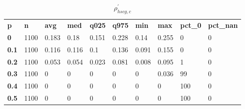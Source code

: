\begin{table}[h]
 \centering 
\footnotesize
\caption{$\rho_{hscg,c}^\prime $}
\label{tab:alphahscgc}
\begin{tabular}[h]{| l l l l l l l l l l|
    } \hline
\textbf{ p} & \textbf{ n} & \textbf{ avg} & \textbf{ med} & \textbf{ q025} & \textbf{ q975} & \textbf{ min} & \textbf{ max} & \textbf{ pct\_0} & \textbf{ pct\_nan}
           \\
  \textbf{  0} & 1100 & 0.183 &  0.18 & 0.151 & 0.228 &  0.14 & 0.255 &   0 & 0
           \\
  \textbf{0.1} & 1100 & 0.116 & 0.116 &   0.1 & 0.136 & 0.091 & 0.155 &   0 & 0
           \\
  \textbf{0.2} & 1100 & 0.053 & 0.054 & 0.023 & 0.081 & 0.008 & 0.095 &   1 & 0
           \\
  \textbf{0.3} & 1100 &     0 &     0 &     0 &     0 &     0 & 0.036 &  99 & 0
           \\
  \textbf{0.4} & 1100 &     0 &     0 &     0 &     0 &     0 &     0 & 100 & 0
           \\
  \textbf{0.5} & 1100 &     0 &     0 &     0 &     0 &     0 &     0 & 100 & 0
           \\
 \hline \end{tabular}
 \end{table}
